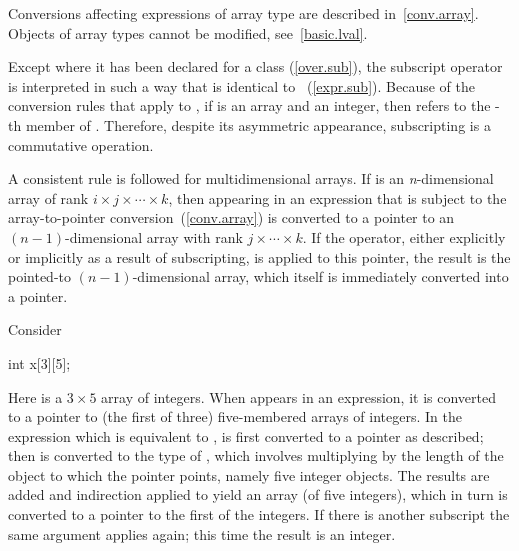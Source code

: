 \pnum
\begin{note}
Conversions affecting expressions of array type are described in~\ref{conv.array}.
Objects of array types cannot be modified, see~\ref{basic.lval}.
\end{note}

\pnum
\begin{note}
Except where it has been declared for a class (\ref{over.sub}),
the subscript operator
\tcode{[]}
is interpreted
in such a way that
is identical to
~(\ref{expr.sub}).
Because of the conversion rules
that apply to
\tcode{+},
if
is an array and
an integer,
then
refers to the
-th
member of
.
Therefore,
despite its asymmetric
appearance, subscripting is a commutative operation.
\end{note}

\pnum
\begin{note}
A consistent rule is followed for
%
multidimensional arrays.
If
is an
\textit{n}-dimensional
array
of rank
$i \times j \times \dotsb \times k$,
then
appearing in an expression
that is subject to the array-to-pointer conversion~(\ref{conv.array})
is converted to
a pointer to an $(n-1)$-dimensional
array with rank
$j \times \dotsb \times k$.
If the
\tcode{*}
operator, either explicitly
or implicitly as a result of subscripting,
is applied to this pointer,
the result is the pointed-to $(n-1)$-dimensional array,
which itself is immediately converted into a pointer.
\begin{example}
Consider

\begin{codeblock}
int x[3][5];
\end{codeblock}

Here
is a $3 \times 5$ array of integers.
When
appears in an expression, it is converted
to a pointer to (the first of three) five-membered arrays of integers.
In the expression
which is equivalent to
,
is first converted to a pointer as described;
then
is converted to the type of
,
which involves multiplying
by the
length of the object to which the pointer points,
namely five integer objects.
The results are added and indirection applied to
yield an array (of five integers), which in turn is converted to
a pointer to the first of the integers.
If there is another subscript the same argument applies
again; this time the result is an integer.
\end{example}
\end{note}

